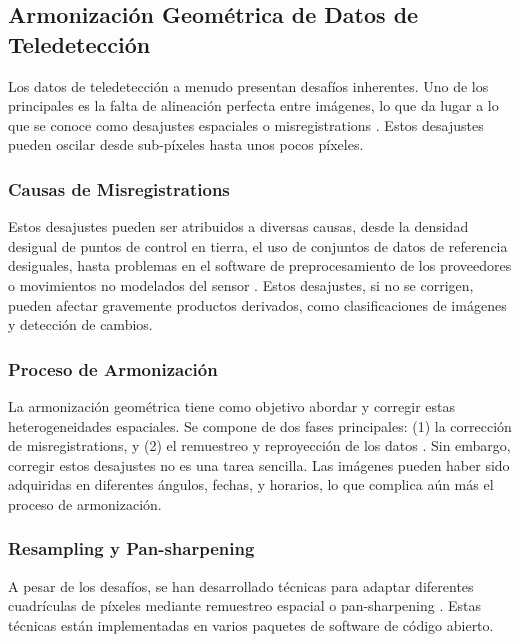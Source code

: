         \subsection{Armonización Geométrica de Datos de Teledetección}
            Los datos de teledetección a menudo presentan desafíos inherentes. Uno de los principales es la falta de alineación perfecta entre imágenes, lo que da lugar a lo que se conoce como desajustes espaciales o misregistrations \autocite{storey2016note, wolfe2002achieving, yan2018sentinel}. Estos desajustes pueden oscilar desde sub-píxeles hasta unos pocos píxeles.
            
            \subsubsection{Causas de Misregistrations}
                Estos desajustes pueden ser atribuidos a diversas causas, desde la densidad desigual de puntos de control en tierra, el uso de conjuntos de datos de referencia desiguales, hasta problemas en el software de preprocesamiento de los proveedores o movimientos no modelados del sensor \autocite{storey2016note}. Estos desajustes, si no se corrigen, pueden afectar gravemente productos derivados, como clasificaciones de imágenes y detección de cambios.
                
            \subsubsection{Proceso de Armonización}
                La armonización geométrica tiene como objetivo abordar y corregir estas heterogeneidades espaciales. Se compone de dos fases principales: (1) la corrección de misregistrations, y (2) el remuestreo y reproyección de los datos \autocite{roy2000impact}. Sin embargo, corregir estos desajustes no es una tarea sencilla. Las imágenes pueden haber sido adquiridas en diferentes ángulos, fechas, y horarios, lo que complica aún más el proceso de armonización.
                
            \subsubsection{Resampling y Pan-sharpening}
                A pesar de los desafíos, se han desarrollado técnicas para adaptar diferentes cuadrículas de píxeles mediante remuestreo espacial o pan-sharpening \autocite{ghassemian2016review, javan2021review, li2017pixel}. Estas técnicas están implementadas en varios paquetes de software de código abierto.
                
